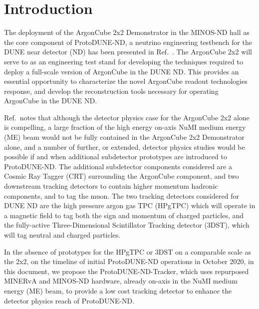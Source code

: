 \section{Introduction}
\label{sec:introduction}

The deployment of the ArgonCube 2x2 Demonstrator in the MINOS-ND hall as the core component of ProtoDUNE-ND, a neutrino engineering testbench for the DUNE near detector (ND) has been presented in Ref.~\addcite. The ArgonCube 2x2 will serve to as an engineering test stand for developing the techniques required to deploy a full-scale version of ArgonCube in the DUNE ND. This provides an essential opportunity to characterize the novel ArgonCube readout technologies response, and develop the reconstruction tools necessary for operating ArgonCube in the DUNE ND.

Ref.~\addcite notes that although the detector physics case for the ArgonCube 2x2 alone is compelling, a large fraction of the high energy on-axis NuMI medium energy (ME) beam would not be fully contained in the ArgonCube 2x2 Demonstrator alone, and a number of further, or extended, detector physics studies would be possible if and when additional subdetector prototypes are introduced to ProtoDUNE-ND. The additional subdetector components considered are a Cosmic Ray Tagger (CRT) surrounding the ArgonCube component, and two downstream tracking detectors to contain higher momentum hadronic components, and to tag the muon. The two tracking detectors considered for DUNE ND are the high pressure argon gas TPC (HPgTPC) which will operate in a magnetic field to tag both the sign and momentum of charged particles, and the fully-active Three-Dimensional Scintillator Tracking detector (3DST), which will tag neutral and charged particles.

In the absence of prototypes for the HPgTPC or 3DST on a comparable scale as the 2x2, on the timeline of initial ProtoDUNE-ND operations in October 2020, in this document, we propose the ProtoDUNE-ND-Tracker, which uses repurposed MINERvA and MINOS-ND hardware, already on-axis in the NuMI medium energy (ME) beam, to provide a low cost tracking detector to enhance the detector physics reach of ProtoDUNE-ND.


